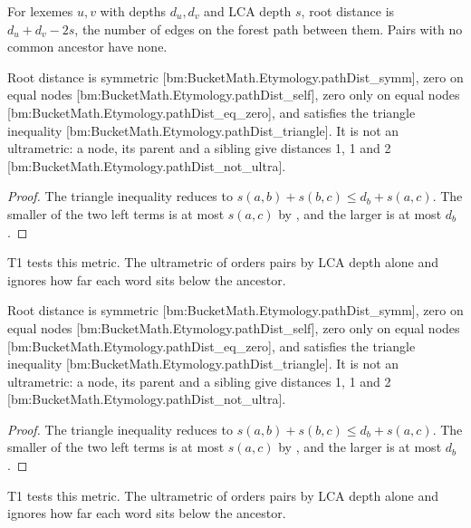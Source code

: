 \documentclass[11pt]{article}
\newcommand{\bm}[1]{{\small[bm:#1]}}
\begin{document}
\begin{definition}
\label{def:rootdist}
For lexemes $u,v$ with depths $d_u,d_v$ and LCA depth $s$, root distance
is $d_u + d_v - 2s$, the number of edges on the forest path between them.
Pairs with no common ancestor have none.
\end{definition}

\begin{theorem}
\label{thm:metric}
Root distance is symmetric \bm{BucketMath.Etymology.pathDist\_symm}, zero
on equal nodes \bm{BucketMath.Etymology.pathDist\_self}, zero only on
equal nodes \bm{BucketMath.Etymology.pathDist\_eq\_zero}, and satisfies
the triangle inequality \bm{BucketMath.Etymology.pathDist\_triangle}. It
is not an ultrametric: a node, its parent and a sibling give distances 1,
1 and 2 \bm{BucketMath.Etymology.pathDist\_not\_ultra}.
\end{theorem}

\begin{proof}
The triangle inequality reduces to $s(a,b)+s(b,c) \le d_b + s(a,c)$. The
smaller of the two left terms is at most $s(a,c)$ by ,
and the larger is at most $d_b$.
\end{proof}

T1 tests this metric. The ultrametric of  orders pairs by
LCA depth alone and ignores how far each word sits below the ancestor.

\begin{theorem}
\label{thm:metric}
Root distance is symmetric \bm{BucketMath.Etymology.pathDist\_symm}, zero
on equal nodes \bm{BucketMath.Etymology.pathDist\_self}, zero only on
equal nodes \bm{BucketMath.Etymology.pathDist\_eq\_zero}, and satisfies
the triangle inequality \bm{BucketMath.Etymology.pathDist\_triangle}. It
is not an ultrametric: a node, its parent and a sibling give distances 1,
1 and 2 \bm{BucketMath.Etymology.pathDist\_not\_ultra}.
\end{theorem}

\begin{proof}
The triangle inequality reduces to $s(a,b)+s(b,c) \le d_b + s(a,c)$. The
smaller of the two left terms is at most $s(a,c)$ by ,
and the larger is at most $d_b$.
\end{proof}

T1 tests this metric. The ultrametric of  orders pairs by
LCA depth alone and ignores how far each word sits below the ancestor.
\end{document}

